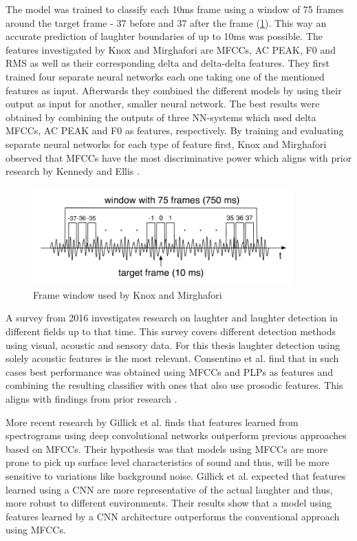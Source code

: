 \documentclass[bsc,frontabs,parskip,deptreport]{infthesis}
\begin{document}
The model was trained to classify each 10ms frame using a window of 75 frames around the target frame - 37 before and 37 after the frame (\ref{fig:know_window}).
This way an accurate prediction of laughter boundaries of up to 10ms was possible. 
The features investigated by Knox and Mirghafori are MFCCs, AC PEAK, F0 and RMS as well as their corresponding delta and delta-delta features.
They first trained four separate neural networks each one taking one of the mentioned features as input.
Afterwards they combined the different models by using their output as input for another, smaller neural network.
The best results were obtained by combining the outputs of three NN-systems which used delta MFCCs, AC PEAK and F0 as features, respectively.
By training and evaluating separate neural networks for each type of feature first, Knox and Mirghafori observed that MFCCs have the most discriminative power which aligns with prior research by Kennedy and Ellis \cite{kennedy2004laughter}.

\begin{figure}[htp]
    \centering
    \includegraphics[width=10cm]{imgs/Knox_window.png}
    \caption{Frame window used by Knox and Mirghafori}
    \label{fig:know_window}
\end{figure}

A survey from 2016 \cite{cosentino2016quantitative} investigates research on laughter and laughter detection in different fields up to that time.
This survey covers different detection methods using visual, acoustic and sensory data.
For this thesis laughter detection using solely acoustic features is the most relevant. Consentino et al. \cite{cosentino2016quantitative} find that in such cases best performance was obtained using MFCCs and PLPs as features and combining the resulting classifier with ones that also use prosodic features.
This aligns with findings from prior research \cite{truong2007automatic, knox2006automatic}.

More recent research by Gillick et al. \cite{gillick2021robust} finds that features learned from spectrograms using deep convolutional networks outperform previous approaches based on MFCCs.
Their hypothesis was that models using MFCCs are more prone to pick up surface level characteristics of sound and thus, will be more sensitive to variations like background noise.
Gillick et al. expected that features learned using a CNN are more representative of the actual laughter and thus, more robust to different environments. 
Their results show that a model using features learned by a CNN architecture outperforms the conventional approach using MFCCs. 
\end{document}
